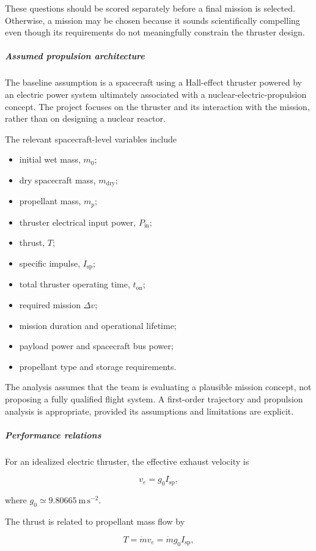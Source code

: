 These questions should be scored separately before a final mission
is selected. Otherwise, a mission may be chosen because it sounds
scientifically compelling even though its requirements do not
meaningfully constrain the thruster design.

\subparagraph{Assumed propulsion architecture}

The baseline assumption is a spacecraft using a Hall-effect
thruster powered by an electric power system ultimately associated
with a nuclear-electric-propulsion concept. The project focuses on
the thruster and its interaction with the mission, rather than on
designing a nuclear reactor.

The relevant spacecraft-level variables include

\begin{itemize}
	\item initial wet mass, \(m_0\);
	\item dry spacecraft mass, \(m_{\mathrm{dry}}\);
	\item propellant mass, \(m_p\);
	\item thruster electrical input power, \(P_{\mathrm{in}}\);
	\item thrust, \(T\);
	\item specific impulse, \(I_{\mathrm{sp}}\);
	\item total thruster operating time, \(t_{\mathrm{on}}\);
	\item required mission \(\Delta v\);
	\item mission duration and operational lifetime;
	\item payload power and spacecraft bus power;
	\item propellant type and storage requirements.
\end{itemize}

The analysis assumes that the team is evaluating a plausible mission
concept, not proposing a fully qualified flight system. A first-order
trajectory and propulsion analysis is appropriate, provided its
assumptions and limitations are explicit.

\subparagraph{Performance relations}

For an idealized electric thruster, the effective exhaust velocity is

\[
	v_e = g_0 I_{\mathrm{sp}},
\]

where \(g_0 \simeq 9.80665\ \mathrm{m\,s^{-2}}\).

The thrust is related to propellant mass flow by

\[
	T = \dot{m}v_e
	= \dot{m}g_0 I_{\mathrm{sp}},
\]

